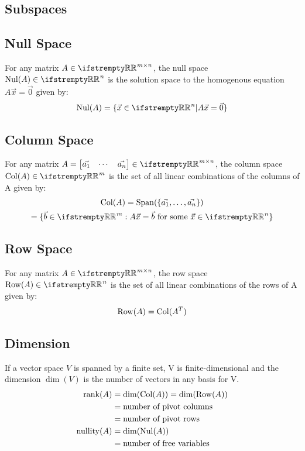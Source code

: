 \documentclass[12pt, a4paper]{article}
\begin{document}
\begin{multicols*}{3}
\section{Subspaces}

\subsection{Null Space}
For any matrix $A \in \RR^{m{\times}n}$, the null space $\nul(A) \in \RR^n$ is the solution space to the homogenous equation $A\vec{x} = \vec{0}$ given by:
\begin{align*}
  \nul(A) = \{\vec{x} \in \RR^n | A\vec{x} = \vec{0}\}
\end{align*}

\subsection{Column Space}
For any matrix $A = \begin{bmatrix}\vec{a_1} & \cdots & \vec{a_n}\end{bmatrix} \in \RR^{m{\times}n}$, the column space $\col(A) \in \RR^m$ is the set of all linear combinations of the columns of A given by:
\begin{gather*}
  \col(A) = \Span(\{\vec{a_1},\ldots,\vec{a_n}\}) \\
          = \{\vec{b} \in \RR^m : A\vec{x} = \vec{b} \text{ for some }\vec{x} \in \RR^n\}
\end{gather*}

\subsection{Row Space}
For any matrix $A \in \RR^{m{\times}n}$, the row space $\row(A) \in \RR^n$ is the set of all linear combinations of the rows of A given by:
\begin{align*}
  \operatorname{Row}(A) = \operatorname{Col}(A^T)
\end{align*}

\subsection{Dimension}
If a vector space $V$ is spanned by a finite set, V is finite-dimensional and the dimension $\dim(V)$ is the number of vectors in any basis for V.
\begin{align*}
  \operatorname{rank}(A) &= \dim(\operatorname{Col}(A)) = \dim(\operatorname{Row}(A)) \\
           &= \text{number of pivot columns} \\ 
           &= \text{number of pivot rows} \\
  \operatorname{nullity}(A) &= \dim(\operatorname{Nul}(A)) \\
              &= \text{number of free variables}
\end{align*}


\end{multicols*}
\end{document}
